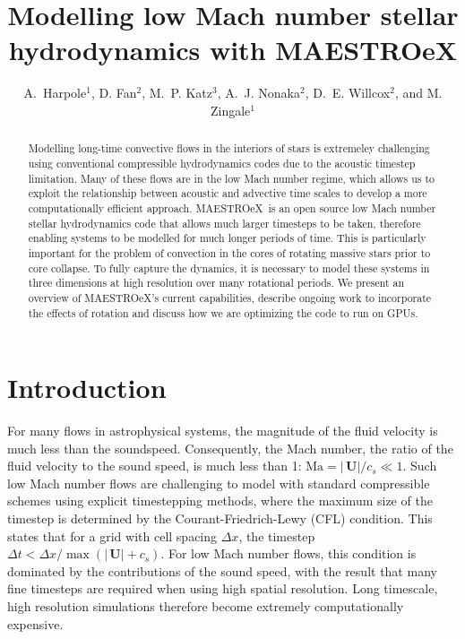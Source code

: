 \documentclass[a4paper]{jpconf}
\newcommand{\maestroex}{{\sffamily MAESTROeX}}
\newcommand{\Ub}{{\,\bm{U}}}
\begin{document}
\title{Modelling low Mach number stellar hydrodynamics with MAESTROeX}

\author{A.~Harpole$^1$,
        D. Fan$^2$,
        M.~P. Katz$^3$,
        A.~J. Nonaka$^2$,
        D.~E. Willcox$^2$, and
        M. Zingale$^1$}

\address{$^1$Department of Physics and Astronomy, Stony Brook
  University, Stony Brook, NY 11794-3800 USA}

\address{$^2$Center for Computational Sciences and Engineering,
  Lawrence Berkeley National Lab, Berkeley, CA 94720 USA}

\address{$^3$NVIDIA Corporation, 2788 San Tomas Expressway,
  Santa Clara, CA, 95050 USA}



\begin{abstract}
Modelling long-time convective flows in the interiors of stars is extremeley challenging using conventional compressible hydrodynamics codes due to the acoustic timestep limitation.
Many of these flows are in the low Mach number regime, which allows us to exploit the relationship between acoustic and advective time scales to develop a more computationally efficient approach.
\maestroex\ is an open source low Mach number stellar hydrodynamics code that allows much larger timesteps to be taken, therefore enabling systems to be modelled for much longer periods of time. This is particularly important for the problem of convection in the cores of rotating massive stars prior to core collapse. To fully capture the dynamics, it is necessary to model these systems in three dimensions at high resolution over many rotational periods.  We present an overview of \maestroex's current capabilities, describe ongoing work to incorporate the effects of rotation and discuss how we are optimizing the code to run on GPUs. 
\end{abstract}


\section{Introduction} \label{sec:intro}

For many flows in astrophysical systems, the magnitude of the fluid velocity is much less than the soundspeed. Consequently, the Mach number, the ratio of the fluid velocity to the sound speed, is much less than 1: $\textrm{Ma} = |\Ub| / c_s \ll 1$. Such low Mach number flows are challenging to model with standard compressible schemes using explicit timestepping methods, where the maximum size of the timestep is determined by the Courant-Friedrich-Lewy (CFL) condition. This states that for a grid with cell spacing $\Delta x$, the timestep $\Delta t <  \Delta x / \max(|\Ub|+c_s)$. For low Mach number flows, this condition is dominated by the contributions of the sound speed, with the result that many fine timesteps are required when using high spatial resolution. Long timescale, high resolution simulations therefore become extremely computationally expensive. 
\end{document}
